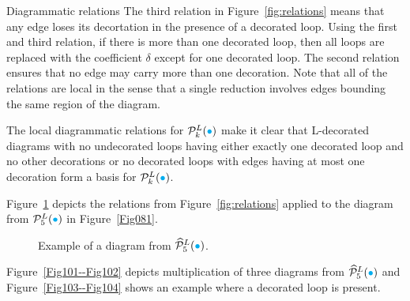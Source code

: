 \begin{section}{Diagrammatic relations}
The third relation in Figure~\ref{fig:relations} means that any edge loses its decortation in the presence of a decorated loop. Using the first and third relation, if there is more than one decorated loop, then all loops are replaced with the coefficient $\delta$ except for one decorated loop. The second relation ensures that no edge may carry more than one decoration. Note that all of the relations are local in the sense that a single reduction involves edges bounding the same region of the diagram. 

\begin{remark}\label{diagbasis}
The local diagrammatic relations for $\mathcal{P}^{L}_{k}({\color{cyan}\bullet})$ make it clear that L-decorated diagrams with no undecorated loops having either exactly one decorated loop and no other decorations or no decorated loops with edges having at most one decoration form a basis for $\mathcal{P}^{L}_{k}({\color{cyan}\bullet})$.
\end{remark}

\begin{example}
Figure~\ref{fig:apply} depicts the relations from Figure~\ref{fig:relations} applied to the diagram from $\mathcal{P}^{L}_{5}({\color{cyan}\bullet})$ in Figure~\ref{Fig081}.
\end{example}

\begin{figure}[!h]
\centering
{}
\caption{Example of a diagram from $\widehat{\mathcal{P}}_{5}^{L}({\color{cyan}\bullet})$.}
\label{fig:apply}
\end{figure}


\begin{example}
\rm Figure~\ref{Fig101--Fig102} depicts multiplication of three diagrams from $\widehat{\mathcal{P}}_{5}^{L}({\color{cyan}\bullet})$ and Figure~\ref{Fig103--Fig104} shows an example where a decorated loop is present. 
\end{example}


\end{section}
